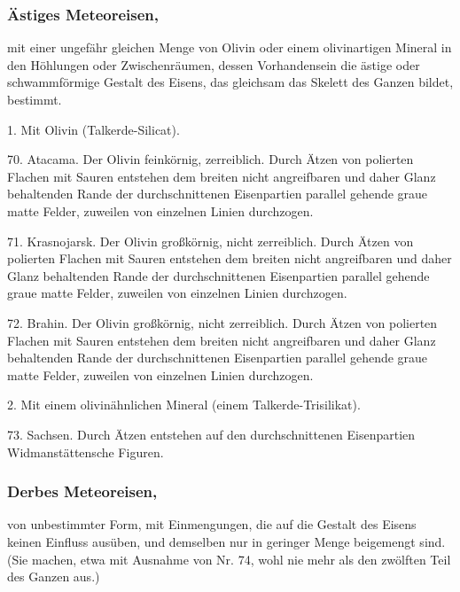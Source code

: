 \documentclass[a4paper, 11pt, oneside, polutonikogreek, german]{article}
\begin{document}
\subsubsection[Ästiges Meteoreisen.]{Ästiges Meteoreisen,}
mit einer ungefähr gleichen Menge von Olivin oder einem olivinartigen Mineral in den Höhlungen oder Zwischenräumen, dessen Vorhandensein die ästige oder schwammförmige Gestalt des Eisens, das gleichsam das Skelett des Ganzen bildet, bestimmt.

\vspace{2ex}

1. Mit Olivin (Talkerde-Silicat).

\vspace{2ex}

70. Atacama. Der Olivin feinkörnig, zerreiblich. Durch Ätzen von polierten Flachen mit Sauren entstehen dem breiten nicht angreifbaren und daher Glanz behaltenden Rande der durchschnittenen Eisenpartien parallel gehende graue matte Felder, zuweilen von einzelnen Linien durchzogen.

71. Krasnojarsk. Der Olivin großkörnig, nicht zerreiblich. Durch Ätzen von polierten Flachen mit Sauren entstehen dem breiten nicht angreifbaren und daher Glanz behaltenden Rande der durchschnittenen Eisenpartien parallel gehende graue matte Felder, zuweilen von einzelnen Linien durchzogen.

72. Brahin. Der Olivin großkörnig, nicht zerreiblich. Durch Ätzen von polierten Flachen mit Sauren entstehen dem breiten nicht angreifbaren und daher Glanz behaltenden Rande der durchschnittenen Eisenpartien parallel gehende graue matte Felder, zuweilen von einzelnen Linien durchzogen.

\vspace{2ex}

2. Mit einem olivinähnlichen Mineral (einem Talkerde-Trisilikat).

\vspace{2ex}

73. Sachsen. Durch Ätzen entstehen auf den durchschnittenen Eisenpartien Widmanstättensche Figuren.

\subsubsection[Derbes Meteoreisen.]{Derbes Meteoreisen,}
von unbestimmter Form, mit Einmengungen, die auf die Gestalt des Eisens keinen Einfluss ausüben, und demselben nur in geringer Menge beigemengt sind. (Sie machen, etwa mit Ausnahme von Nr. 74, wohl nie mehr als den zwölften Teil des Ganzen aus.)
\end{document}
